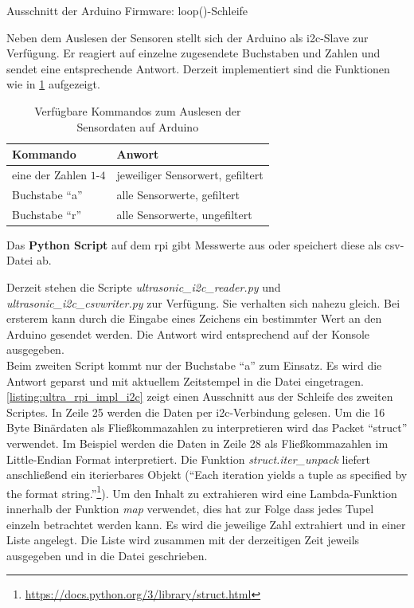 \begin{listing}[!ht]
    \caption{Ausschnitt der Arduino Firmware: loop()-Schleife}
    \label{listing:ultra_arduino_loop}
\end{listing}

Neben dem Auslesen der Sensoren stellt sich der Arduino als \gls{i2c}-Slave zur Verfügung. Er reagiert auf einzelne zugesendete Buchstaben und Zahlen und sendet eine entsprechende Antwort. Derzeit implementiert sind die Funktionen wie in \ref{tab:ultra_arduino_impl_i2c} aufgezeigt.

\begin{table}[!ht]
    \centering
    \caption{Verfügbare Kommandos zum Auslesen der Sensordaten auf Arduino}
    \begin{tabularx}{0.7\textwidth}{ l | l }
    Kommando & Anwort \\ \hline
    eine der Zahlen $1$-$4$ & jeweiliger Sensorwert, gefiltert\\
    Buchstabe \enquote{a} & alle Sensorwerte, gefiltert\\
    Buchstabe \enquote{r} & alle Sensorwerte, ungefiltert
    \label{tab:ultra_arduino_impl_i2c}
    \end{tabularx}
\end{table}

Das \textbf{\large Python Script} auf dem \gls{rpi} gibt Messwerte aus oder speichert diese als \acrshort{csv}-Datei ab.

Derzeit stehen die Scripte \textit{ultrasonic\_i2c\_reader.py} und \textit{ultrasonic\_i2c\_csvwriter.py} zur Verfügung. Sie verhalten sich nahezu gleich. Bei ersterem kann durch die Eingabe eines Zeichens ein bestimmter Wert an den Arduino gesendet werden. Die Antwort wird entsprechend auf der Konsole ausgegeben.\\
Beim zweiten Script kommt nur der Buchstabe \enquote{a} zum Einsatz. Es wird die Antwort geparst und mit aktuellem Zeitstempel in die Datei eingetragen. \ref{listing:ultra_rpi_impl_i2c} zeigt einen Ausschnitt aus der Schleife des zweiten Scriptes. In Zeile 25 werden die Daten per \gls{i2c}-Verbindung gelesen. Um die 16 Byte Binärdaten als Fließkommazahlen zu interpretieren wird das Packet \enquote{struct} verwendet. Im Beispiel werden die Daten in Zeile 28 als Fließkommazahlen im Little-Endian Format interpretiert. Die Funktion \textit{struct.iter\_unpack} liefert anschließend ein iterierbares Objekt (\enquote{Each iteration yields a tuple as specified by the format string.}\footnote{\url{https://docs.python.org/3/library/struct.html}}). Um den Inhalt zu extrahieren wird eine Lambda-Funktion innerhalb der Funktion \textit{map} verwendet, dies hat zur Folge dass jedes Tupel einzeln betrachtet werden kann. Es wird die jeweilige Zahl extrahiert und in einer Liste angelegt. Die Liste wird zusammen mit der derzeitigen Zeit jeweils ausgegeben und in die Datei geschrieben.

